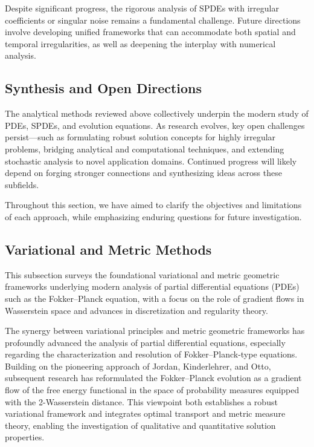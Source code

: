 \documentclass[sigconf]{acmart}
\begin{document}
Despite significant progress, the rigorous analysis of SPDEs with irregular coefficients or singular noise remains a fundamental challenge. Future directions involve developing unified frameworks that can accommodate both spatial and temporal irregularities, as well as deepening the interplay with numerical analysis.

\subsection{Synthesis and Open Directions}
The analytical methods reviewed above collectively underpin the modern study of PDEs, SPDEs, and evolution equations. As research evolves, key open challenges persist—such as formulating robust solution concepts for highly irregular problems, bridging analytical and computational techniques, and extending stochastic analysis to novel application domains. Continued progress will likely depend on forging stronger connections and synthesizing ideas across these subfields.

Throughout this section, we have aimed to clarify the objectives and limitations of each approach, while emphasizing enduring questions for future investigation.

\subsection{Variational and Metric Methods}

This subsection surveys the foundational variational and metric geometric frameworks underlying modern analysis of partial differential equations (PDEs) such as the Fokker--Planck equation, with a focus on the role of gradient flows in Wasserstein space and advances in discretization and regularity theory.

The synergy between variational principles and metric geometric frameworks has profoundly advanced the analysis of partial differential equations, especially regarding the characterization and resolution of Fokker–Planck-type equations. Building on the pioneering approach of Jordan, Kinderlehrer, and Otto, subsequent research has reformulated the Fokker–Planck evolution as a gradient flow of the free energy functional in the space of probability measures equipped with the 2-Wasserstein distance. This viewpoint both establishes a robust variational framework and integrates optimal transport and metric measure theory, enabling the investigation of qualitative and quantitative solution properties. 
\end{document}
